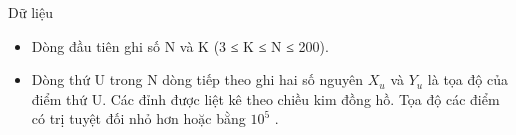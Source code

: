 Dữ liệu
\begin{itemize}
	\item     Dòng đầu tiên ghi số N và K (3 ≤ K ≤ N ≤ 200).   
	\item     Dòng thứ U trong N dòng tiếp theo ghi hai số nguyên $X_{u}$    và $Y_{u}$    là tọa độ của điểm thứ U. Các đỉnh được liệt kê theo chiều kim đồng hồ. Tọa độ các điểm có trị tuyệt đối nhỏ hơn hoặc bằng $10^{5}$    .   
\end{itemize}